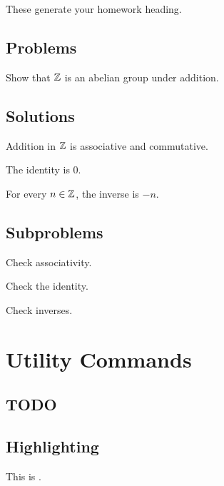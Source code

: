 \documentclass{article}
\begin{document}
These generate your homework heading.

\subsection{Problems}

\begin{problem}
    Show that $\mathbb{Z}$ is an abelian group under addition.
\end{problem}

\subsection{Solutions}

\begin{solution}
    Addition in $\mathbb{Z}$ is associative and commutative.

    The identity is $0$.

    For every $n\in\mathbb{Z}$, the inverse is $-n$.
\end{solution}

\subsection{Subproblems}

\begin{subproblem}
    \item Check associativity.
    \item Check the identity.
    \item Check inverses.
\end{subproblem}


\section{Utility Commands}

\subsection{TODO}


\subsection{Highlighting}

This is .
\end{document}
